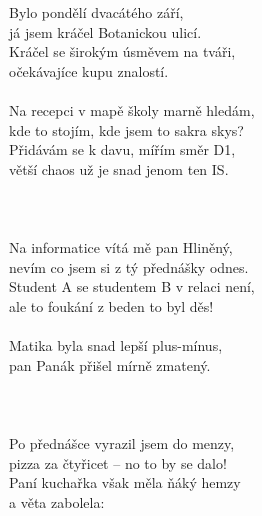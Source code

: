 
Bylo pondělí dvacátého září,\\
já jsem kráčel Botanickou ulicí.\\
Kráčel se širokým úsměvem na tváři,\\
očekávajíce kupu znalostí.\\
\\
Na recepci v mapě školy marně hledám,\\
kde to stojím, kde jsem to sakra skys?\\
Přidávám se k davu, mířím směr D1,\\
větší chaos už je snad jenom ten IS.\\
\\
\\
\\
Na informatice vítá mě pan Hliněný,\\
nevím co jsem si z tý přednášky odnes.\\
Student A se studentem B v relaci není,\\
ale to foukání z beden to byl děs!\\
\\
Matika byla snad lepší plus-mínus,\\
pan Panák přišel mírně zmatený.\\
\\
\chorushere\\
\\
Po přednášce vyrazil jsem do menzy,\\
pizza za čtyřicet -- no to by se dalo!\\
Paní kuchařka však měla ňáký hemzy\\
a věta zabolela: \\

